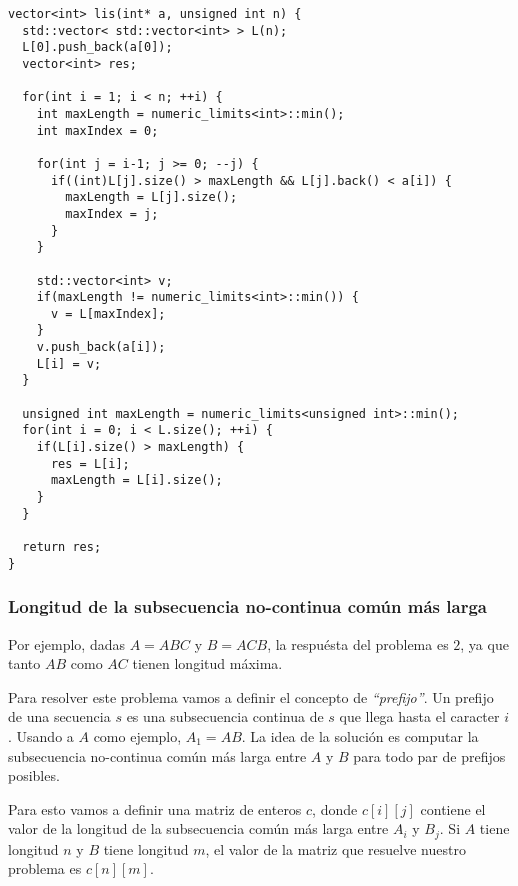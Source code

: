 \begin{center}
\begin{minipage}{1.15\textwidth}
\begin{lstlisting}[frame=lrtb]
vector<int> lis(int* a, unsigned int n) {
  std::vector< std::vector<int> > L(n);
  L[0].push_back(a[0]);
  vector<int> res;

  for(int i = 1; i < n; ++i) {
    int maxLength = numeric_limits<int>::min();
    int maxIndex = 0;

    for(int j = i-1; j >= 0; --j) {
      if((int)L[j].size() > maxLength && L[j].back() < a[i]) {
        maxLength = L[j].size();
        maxIndex = j;
      }
    }
    
    std::vector<int> v;
    if(maxLength != numeric_limits<int>::min()) {
      v = L[maxIndex];      
    }
    v.push_back(a[i]);
    L[i] = v;
  }

  unsigned int maxLength = numeric_limits<unsigned int>::min();
  for(int i = 0; i < L.size(); ++i) {
    if(L[i].size() > maxLength) {
      res = L[i];
      maxLength = L[i].size();
    }
  }

  return res;
}
\end{lstlisting}
\end{minipage}
\end{center}


\newpage
\subsubsection{Longitud de la subsecuencia no-continua com\'un m\'as larga}

\noindent{}

Por ejemplo, dadas $A = ABC$ y $B = ACB$, la respu\'esta del problema es $2$, ya que tanto $AB$ como $AC$ tienen longitud m\'axima.

Para resolver este problema vamos a definir el concepto de \emph{``prefijo''}. Un prefijo de una secuencia $s$ es una subsecuencia continua de $s$ que llega hasta el caracter $i$. Usando a $A$ como ejemplo, $A_1 = AB$. La idea de la soluci\'on es computar la subsecuencia no-continua com\'un m\'as larga entre $A$ y $B$ para todo par de prefijos posibles. 

Para esto vamos a definir una matriz de enteros $c$, donde $c[i][j]$ contiene el valor de la longitud de la subsecuencia com\'un m\'as larga entre $A_i$ y $B_j$. Si $A$ tiene longitud $n$ y $B$ tiene longitud $m$, el valor de la matriz que resuelve nuestro problema es $c[n][m]$.

